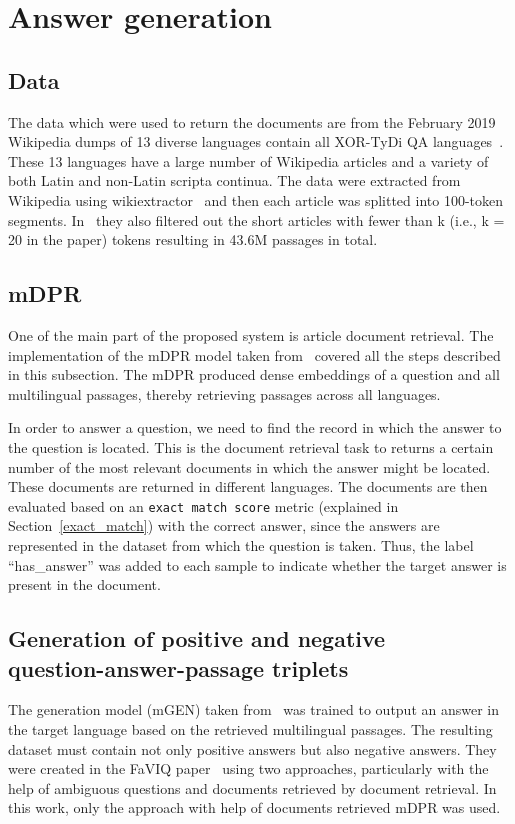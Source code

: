 \section{Answer generation}


\subsection{Data}
The data which were used to return the documents are from the February 2019 Wikipedia dumps of 13 diverse languages contain all XOR-TyDi QA languages~\cite{mDPR}. These 13 languages have a large number of Wikipedia articles and a variety of both Latin and non-Latin scripta continua. The data were extracted from Wikipedia using wikiextractor~\cite{wikiextractor} and then each article was splitted into 100-token segments. In~\cite{mDPR} they also filtered out the short articles with fewer than k (i.e., k = 20 in the paper) tokens resulting in 43.6M passages in total.

\subsection{mDPR}
One of the main part of the proposed system is article document retrieval. The implementation of the mDPR model taken from~\cite{mDPR} covered all the steps described in this subsection. The mDPR produced dense embeddings of a question and all multilingual passages, thereby retrieving passages across all languages.

In order to answer a question, we need to find the record in which the answer to the question is located. This is the document retrieval task to returns a certain number of the most relevant documents in which the answer might be located. These documents are returned in different languages. The documents are then evaluated based on an \texttt{exact match score} metric (explained in Section~\ref{exact_match}) with the correct answer, since the answers are represented in the dataset from which the question is taken. Thus, the label ``has\_answer'' was added to each sample to indicate whether the target answer is present in the document.


\subsection{Generation of positive and negative\\question-answer-passage triplets}\label{pos_neg_answers}
The generation model (mGEN) taken from~\cite{mDPR} was trained to output an answer in the target language based on the retrieved multilingual passages. The resulting dataset must contain not only positive answers but also negative answers. They were created in the FaVIQ paper~\cite{faviq} using two approaches, particularly with the help of ambiguous questions and documents retrieved by document retrieval. In this work, only the approach with help of documents retrieved mDPR was used.

